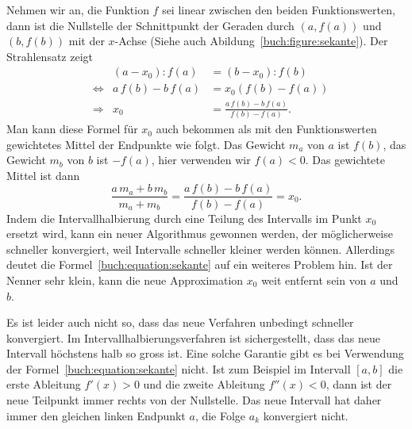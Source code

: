 Nehmen wir an, die Funktion $f$ sei linear zwischen den beiden
Funktionswerten, dann ist die Nullstelle der Schnittpunkt
der Geraden durch $(a,f(a))$ und $(b,f(b))$ mit der $x$-Achse
(Siehe auch Abildung~\ref{buch:figure:sekante}).
Der Strahlensatz zeigt
%
%
\[
\begin{aligned}
&&
(a-x_0) : f(a)
&=
(b - x_0) : f(b)
\\
&\Leftrightarrow&
a\,f(b) - b\,f(a)
&=
x_0(f(b)-f(a))
\\
&\Rightarrow&
x_0
&=
\frac{a\,f(b)-b\,f(a)}{f(b)-f(a)}.
\end{aligned}
\]
Man kann diese Formel für $x_0$ auch bekommen als mit den
Funktionswerten gewichtetes Mittel der Endpunkte wie folgt.
Das Gewicht $m_a$ von $a$ ist $f(b)$, das Gewicht $m_b$ von
$b$ ist $-f(a)$, hier verwenden wir $f(a)<0$.
%
%
Das gewichtete Mittel ist dann
\begin{equation}
\frac{a\,m_a+b\,m_b}{m_a+m_b}
=
\frac{a\,f(b)-b\,f(a)}{f(b)-f(a)}=x_0.
\label{buch:equation:sekante}
\end{equation}
Indem die Intervallhalbierung durch eine Teilung des
Intervalls im Punkt $x_0$ ersetzt wird, kann ein neuer Algorithmus
gewonnen werden, der möglicherweise schneller konvergiert, weil
Intervalle schneller kleiner werden können.
Allerdings deutet die Formel~\eqref{buch:equation:sekante} auf
ein weiteres Problem hin.
Ist der Nenner sehr klein, kann die neue Approximation $x_0$ weit
entfernt sein von $a$ und $b$.

Es ist leider auch nicht so, dass das neue Verfahren unbedingt schneller 
konvergiert.
Im Intervallhalbierungsverfahren ist sichergestellt, dass das neue
Intervall höchstens halb so gross ist.
Eine solche Garantie gibt es bei Verwendung der
Formel~\eqref{buch:equation:sekante} nicht.
Ist zum Beispiel im Intervall $[a,b]$ die erste Ableitung $f'(x)>0$ und
die zweite Ableitung $f''(x)<0$,
dann ist der neue Teilpunkt immer rechts von der Nullstelle.
Das neue Intervall hat daher immer den gleichen linken Endpunkt $a$,
die Folge $a_k$ konvergiert nicht.

